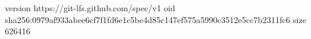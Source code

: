 version https://git-lfs.github.com/spec/v1
oid sha256:0979af933abee6cf7f1fd6e1c5be4d85c147ef575a5990c3512e5cc7b2311fc6
size 626416
